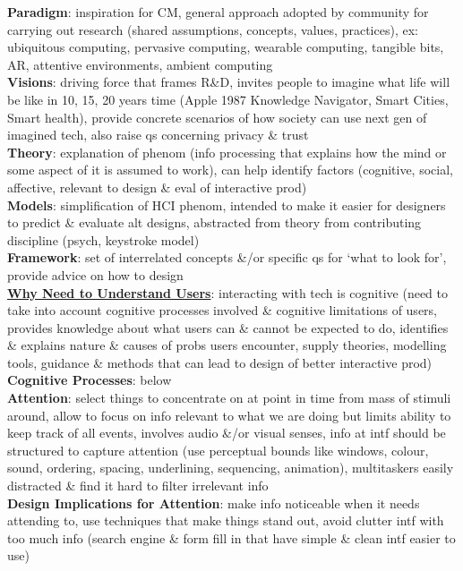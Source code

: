 \documentclass[a4paper]{article}
\begin{document}
\begin{multicols}{3}
        \textbf{Paradigm}: inspiration for CM, general approach adopted by community for carrying out research (shared assumptions, concepts, values, practices), ex: ubiquitous computing, pervasive computing, wearable computing, tangible bits, AR, attentive environments, ambient computing\\
        \textbf{Visions}: driving force that frames R\&D, invites people to imagine what life will be like in 10, 15, 20 years time (Apple 1987 Knowledge Navigator, Smart Cities, Smart health), provide concrete scenarios of how society can use next gen of imagined tech, also  raise qs concerning privacy \& trust\\
        \textbf{Theory}: explanation of phenom (info processing that explains how the mind or some aspect of it is assumed to work), can help identify factors (cognitive, social, affective, relevant to design \& eval of interactive prod)\\
        \textbf{Models}: simplification of HCI phenom, intended to make it easier for designers to predict \& evaluate alt designs, abstracted from theory from contributing discipline (psych, keystroke model)\\
        \textbf{Framework}: set of interrelated concepts \&/or specific qs for `what to look for', provide advice on how to design\\
        \underline{\textbf{Why Need to Understand Users}}: interacting with tech is cognitive (need to take into account cognitive processes involved \& cognitive limitations of users, provides knowledge about what users can \& cannot be expected to do, identifies \& explains nature \& causes of probs users encounter, supply theories, modelling tools, guidance \& methods that can lead to design of better interactive prod)\\
        \textbf{Cognitive Processes}: below\\
        \textbf{Attention}: select things to concentrate on at point in time from mass of stimuli around, allow to focus on info relevant to what we are doing but limits ability to keep track of all events, involves audio \&/or visual senses, info at intf should be structured to capture attention (use perceptual bounds like windows, colour, sound, ordering, spacing, underlining, sequencing, animation), multitaskers easily distracted \& find it hard to filter irrelevant info\\
        \textbf{Design Implications for Attention}: make info noticeable when it needs attending to, use techniques that make things stand out, avoid clutter intf with too much info (search engine \& form fill in that have simple \& clean intf easier to use)\\

\end{multicols}
\end{document}
